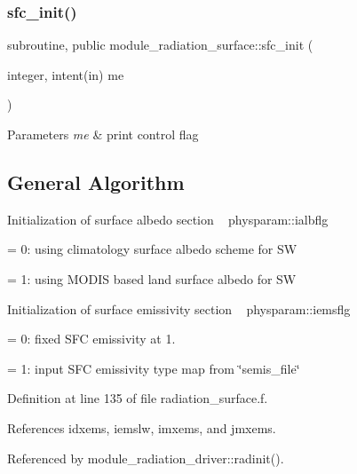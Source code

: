 \subsubsection{\texorpdfstring{sfc\+\_\+init()}{sfc\_init()}}
{\footnotesize\ttfamily subroutine, public module\+\_\+radiation\+\_\+surface\+::sfc\+\_\+init (\begin{DoxyParamCaption}\item[{integer, intent(in)}]{me }\end{DoxyParamCaption})}


\begin{DoxyParams}{Parameters}
{\em me} & print control flag \\
\hline
\end{DoxyParams}
\hypertarget{group__module__radiation__surface_gen_sfc_init}{}\subsection{General Algorithm}\label{group__module__radiation__surface_gen_sfc_init}

\begin{DoxyItemize}
\item Initialization of surface albedo section ~\newline
 physparam\+::ialbflg
\begin{DoxyItemize}
\item = 0\+: using climatology surface albedo scheme for SW
\item = 1\+: using M\+O\+D\+IS based land surface albedo for SW
\end{DoxyItemize}
\item Initialization of surface emissivity section ~\newline
 physparam\+::iemsflg
\begin{DoxyItemize}
\item = 0\+: fixed S\+FC emissivity at 1.
\item = 1\+: input S\+FC emissivity type map from \char`\"{}semis\+\_\+file\char`\"{} 
\end{DoxyItemize}
\end{DoxyItemize}

Definition at line 135 of file radiation\+\_\+surface.\+f.



References idxems, iemslw, imxems, and jmxems.



Referenced by module\+\_\+radiation\+\_\+driver\+::radinit().

